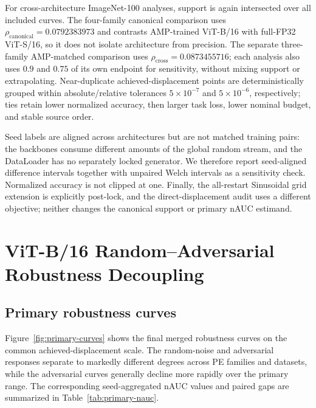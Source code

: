 \documentclass[preprint,12pt,authoryear]{elsarticle}
\begin{document}
For cross-architecture ImageNet-100 analyses, support is again intersected
over all included curves. The four-family canonical comparison uses
$\rho_{\mathrm{canonical}}=0.0792383973$ and contrasts AMP-trained ViT-B/16
with full-FP32 ViT-S/16, so it does not isolate architecture from precision.
The separate three-family AMP-matched comparison uses
$\rho_{\mathrm{cross}}=0.0873455716$; each analysis also uses $0.9$ and $0.75$
of its own endpoint for sensitivity, without mixing support or extrapolating.
Near-duplicate achieved-displacement points are deterministically grouped
within absolute/relative tolerances $5\times10^{-7}$ and $5\times10^{-6}$,
respectively; ties retain lower normalized accuracy, then larger task loss,
lower nominal budget, and stable source order.

Seed labels are aligned across architectures but are not matched training
pairs: the backbones consume different amounts of the global random stream,
and the DataLoader has no separately locked generator. We therefore report
seed-aligned difference intervals together with unpaired Welch intervals as a
sensitivity check. Normalized accuracy is not clipped at one. Finally, the
all-restart Sinusoidal grid extension is explicitly post-lock, and the
direct-displacement audit uses a different objective; neither changes the
canonical support or primary nAUC estimand.


\section{ViT-B/16 Random--Adversarial Robustness Decoupling}
\label{sec:decoupling-results}

\subsection{Primary robustness curves}

Figure~\ref{fig:primary-curves} shows the final merged robustness curves on the
common achieved-displacement scale. The random-noise and adversarial responses
separate to markedly different degrees across PE families and datasets, while
the adversarial curves generally decline more rapidly over the primary range.
The corresponding seed-aggregated nAUC values and paired gaps are summarized in
Table~\ref{tab:primary-nauc}.
\end{document}
